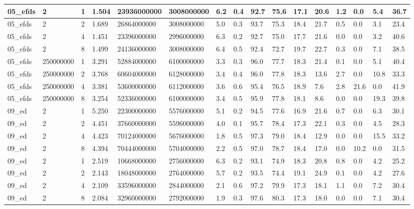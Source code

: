 \documentclass[12pt]{article}
\begin{document}
\begin{flushleft}
\begin{landscape}
\begin{tabular}{| l | l | l | l | l | l | l | l | l | l | l | l | l | l | l | l |}
		05\_efds & 2 & 1 & 1.504 & 23936000000 & 3008000000 & 6.2 & 0.4 & 92.7 & 75.6 & 17.1 & 20.6 & 1.2 & 0.0 & 5.4 & 36.7 \\ \hline
		05\_efds & 2 & 2 & 1.689 & 26864000000 & 3008000000 & 5.0 & 0.3 & 93.7 & 75.3 & 18.4 & 21.7 & 0.5 & 0.0 & 3.1 & 23.4 \\ \hline
		05\_efds & 2 & 4 & 1.451 & 23396000000 & 2996000000 & 6.3 & 0.2 & 92.7 & 75.0 & 17.7 & 21.6 & 0.0 & 0.0 & 3.2 & 40.6 \\ \hline
		05\_efds & 2 & 8 & 1.499 & 24136000000 & 3008000000 & 6.4 & 0.5 & 92.4 & 72.7 & 19.7 & 22.7 & 0.3 & 0.0 & 7.1 & 38.5 \\ \hline
		05\_efds & 250000000 & 1 & 3.291 & 52884000000 & 6100000000 & 3.3 & 0.3 & 96.0 & 77.7 & 18.3 & 21.4 & 0.1 & 0.0 & 5.1 & 40.4 \\ \hline
		05\_efds & 250000000 & 2 & 3.768 & 60604000000 & 6128000000 & 3.4 & 0.4 & 96.0 & 77.8 & 18.3 & 13.6 & 2.7 & 0.0 & 10.8 & 33.3 \\ \hline
		05\_efds & 250000000 & 4 & 3.381 & 53600000000 & 6112000000 & 3.6 & 0.6 & 95.4 & 76.5 & 18.9 & 7.6 & 2.8 & 21.6 & 0.0 & 41.9 \\ \hline
		05\_efds & 250000000 & 8 & 3.254 & 52336000000 & 6100000000 & 3.4 & 0.5 & 95.9 & 77.8 & 18.1 & 8.6 & 0.0 & 0.0 & 19.3 & 39.8 \\ \hline
		09\_ed & 2 & 1 & 5.250 & 22300000000 & 5576000000 & 5.1 & 0.2 & 94.5 & 77.6 & 16.9 & 21.6 & 0.7 & 0.0 & 6.3 & 30.1 \\ \hline
		09\_ed & 2 & 2 & 4.451 & 37660000000 & 5596000000 & 4.0 & 0.1 & 95.7 & 78.4 & 17.3 & 22.1 & 0.3 & 0.0 & 4.5 & 28.3 \\ \hline
		09\_ed & 2 & 4 & 4.423 & 70124000000 & 5676000000 & 1.8 & 0.5 & 97.3 & 79.0 & 18.4 & 12.9 & 0.0 & 0.0 & 15.5 & 33.2 \\ \hline
		09\_ed & 2 & 8 & 4.394 & 70444000000 & 5704000000 & 2.2 & 0.5 & 97.0 & 78.7 & 18.4 & 17.0 & 0.0 & 10.2 & 0.0 & 31.5 \\ \hline
		09\_ed & 2 & 1 & 2.519 & 10668000000 & 2756000000 & 6.3 & 0.2 & 93.1 & 74.9 & 18.3 & 20.8 & 0.8 & 0.0 & 4.2 & 25.2 \\ \hline
		09\_ed & 2 & 2 & 2.143 & 18048000000 & 2764000000 & 5.7 & 0.2 & 93.5 & 74.4 & 19.1 & 24.9 & 0.1 & 0.0 & 4.2 & 27.6 \\ \hline
		09\_ed & 2 & 4 & 2.109 & 33596000000 & 2844000000 & 2.1 & 0.6 & 97.2 & 79.9 & 17.3 & 18.1 & 1.1 & 0.0 & 7.2 & 30.4 \\ \hline
		09\_ed & 2 & 8 & 2.084 & 32960000000 & 2792000000 & 1.9 & 0.3 & 97.6 & 80.3 & 17.3 & 18.0 & 0.0 & 0.0 & 7.1 & 30.4 \\ \hline

\end{tabular}
\end{landscape}
\end{flushleft}
\end{document}
